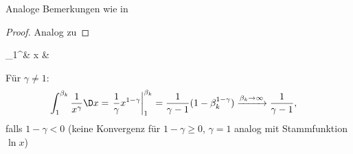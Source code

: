 \begin{remark}
	Analoge Bemerkungen wie in 
\end{remark}
\begin{proof}
	Analog zu 
\end{proof}

\begin{example}
	{\zeroAmsmathAlignVSpaces*
	\begin{flalign*}
	\int_1^\infty & \D x &
	\end{flalign*}}
	
	Für $\gamma \neq 1$:\begin{align*}
		\int_1^{\beta_k} \frac{1}{x^\gamma} \D x &= \left.\frac{1}{\gamma} x^{1 - \gamma}\right|_1^{\beta_k} = \frac{1}{\gamma - 1} (1 - \beta_k^{1 - \gamma}) \xrightarrow{\beta_k\to\infty} \frac{1}{\gamma - 1},
	\end{align*}
	falls $1 - \gamma < 0$ (keine Konvergenz für $1 - \gamma \ge 0$, $\gamma = 1$ analog mit Stammfunktion $\ln x$)
\end{example}

